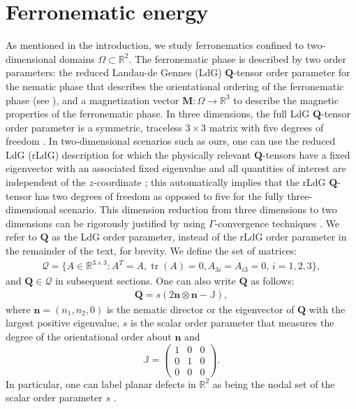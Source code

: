 \documentclass{article}
\def\Qvec{\mathbf{Q}}
\def \Mvec{\mathbf{M}}
\def\nvec{\mathbf{n}}
\begin{document}
\section{Ferronematic energy}
\label{sec:2}
As mentioned in the introduction, we study ferronematics confined to two-dimensional domains $\Omega\subset\mathbb R^2$. The ferronematic phase is described by two order parameters: the reduced Landau-de Gennes (LdG) $\Qvec$-tensor order parameter for the nematic phase that describes the orientational ordering of the ferronematic phase (see \cite{han2020reduced}), and a magnetization vector $\Mvec: \Omega\rightarrow\mathbb R^3$ to describe the magnetic properties of the ferronematic phase. In three dimensions, the full LdG $\Qvec$-tensor order parameter is a symmetric, traceless $3\times 3$ matrix with five degrees of freedom \cite{Gennes}.  
In two-dimensional scenarios such as ours, one can use the reduced LdG (rLdG) description for which the physically relevant $\Qvec$-tensors have a fixed eigenvector with an associated fixed eigenvalue and all quantities of interest are independent of the $z$-coordinate \cite{han2021tailored}; this automatically implies that the rLdG $\Qvec$-tensor has two degrees of freedom as opposed to five for the fully three-dimensional scenario. This dimension reduction from three dimensions to two dimensions can be rigorously justified by using $\Gamma$-convergence techniques \cite{golovaty2015dimension}. We refer to $\Qvec$ as the LdG order parameter, instead of the rLdG order parameter in the remainder of the text, for brevity. We define the set of matrices: 
\begin{eqnarray}
\mathcal{Q}=\bigl\{A\in\mathbb R^{3\times 3}: A^T=A, \operatorname{tr}(A)=0, A_{3i}=A_{i3}=0, \, i=1,2, 3 \bigl\},\nonumber
\end{eqnarray} and $\Qvec \in \mathcal{Q}$ in subsequent sections. One can also write $\Qvec$ as follows:
\begin{eqnarray}\label{eq:en4}
\Qvec=s\left(2\nvec\otimes\nvec - \mathbb{J}\right),
\end{eqnarray}
where $\nvec = (n_1, n_2, 0)$ is the nematic director or the eigenvector of $\Qvec$ with the largest positive eigenvalue, $s$ is the scalar order parameter that measures the degree of the orientational order about $\nvec$ and
\begin{displaymath}
\mathbb{J}=\begin{pmatrix}
1 & 0 & 0\\
0 & 1 & 0\\
0 & 0 & 0
\end{pmatrix}.
\end{displaymath}
In particular, one can label planar defects in $\mathbb{R}^2$ as being the nodal set of the scalar order parameter $s$ \cite{han2021tailored}.
\end{document}
